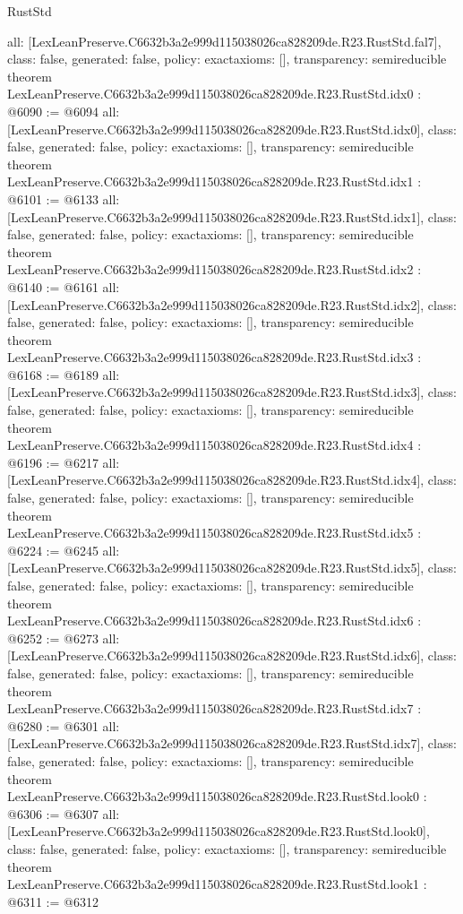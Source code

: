 \begin{lexlean}{RustStd}
\begin{coremodule}
{  all: [LexLeanPreserve.C6632b3a2e999d115038026ca828209de.R23.RustStd.fal7],
  class: false,
  generated: false,
  policy: exact{axioms: []},
  transparency: semireducible
}
theorem LexLeanPreserve.C6632b3a2e999d115038026ca828209de.R23.RustStd.idx0 : @6090 := @6094 {
  all: [LexLeanPreserve.C6632b3a2e999d115038026ca828209de.R23.RustStd.idx0],
  class: false,
  generated: false,
  policy: exact{axioms: []},
  transparency: semireducible
}
theorem LexLeanPreserve.C6632b3a2e999d115038026ca828209de.R23.RustStd.idx1 : @6101 := @6133 {
  all: [LexLeanPreserve.C6632b3a2e999d115038026ca828209de.R23.RustStd.idx1],
  class: false,
  generated: false,
  policy: exact{axioms: []},
  transparency: semireducible
}
theorem LexLeanPreserve.C6632b3a2e999d115038026ca828209de.R23.RustStd.idx2 : @6140 := @6161 {
  all: [LexLeanPreserve.C6632b3a2e999d115038026ca828209de.R23.RustStd.idx2],
  class: false,
  generated: false,
  policy: exact{axioms: []},
  transparency: semireducible
}
theorem LexLeanPreserve.C6632b3a2e999d115038026ca828209de.R23.RustStd.idx3 : @6168 := @6189 {
  all: [LexLeanPreserve.C6632b3a2e999d115038026ca828209de.R23.RustStd.idx3],
  class: false,
  generated: false,
  policy: exact{axioms: []},
  transparency: semireducible
}
theorem LexLeanPreserve.C6632b3a2e999d115038026ca828209de.R23.RustStd.idx4 : @6196 := @6217 {
  all: [LexLeanPreserve.C6632b3a2e999d115038026ca828209de.R23.RustStd.idx4],
  class: false,
  generated: false,
  policy: exact{axioms: []},
  transparency: semireducible
}
theorem LexLeanPreserve.C6632b3a2e999d115038026ca828209de.R23.RustStd.idx5 : @6224 := @6245 {
  all: [LexLeanPreserve.C6632b3a2e999d115038026ca828209de.R23.RustStd.idx5],
  class: false,
  generated: false,
  policy: exact{axioms: []},
  transparency: semireducible
}
theorem LexLeanPreserve.C6632b3a2e999d115038026ca828209de.R23.RustStd.idx6 : @6252 := @6273 {
  all: [LexLeanPreserve.C6632b3a2e999d115038026ca828209de.R23.RustStd.idx6],
  class: false,
  generated: false,
  policy: exact{axioms: []},
  transparency: semireducible
}
theorem LexLeanPreserve.C6632b3a2e999d115038026ca828209de.R23.RustStd.idx7 : @6280 := @6301 {
  all: [LexLeanPreserve.C6632b3a2e999d115038026ca828209de.R23.RustStd.idx7],
  class: false,
  generated: false,
  policy: exact{axioms: []},
  transparency: semireducible
}
theorem LexLeanPreserve.C6632b3a2e999d115038026ca828209de.R23.RustStd.look0 : @6306 := @6307 {
  all: [LexLeanPreserve.C6632b3a2e999d115038026ca828209de.R23.RustStd.look0],
  class: false,
  generated: false,
  policy: exact{axioms: []},
  transparency: semireducible
}
theorem LexLeanPreserve.C6632b3a2e999d115038026ca828209de.R23.RustStd.look1 : @6311 := @6312 {
}
\end{coremodule}
\end{lexlean}
